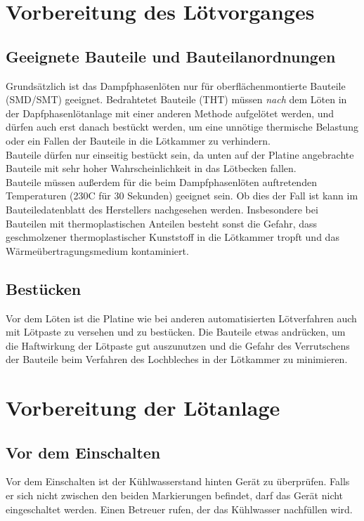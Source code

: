 \documentclass{\basedir/fablab-document}
\begin{document}
	\section{Vorbereitung des Lötvorganges}
	\subsection{Geeignete Bauteile und Bauteilanordnungen}
	
	Grundsätzlich ist das Dampfphasenlöten nur für oberflächenmontierte Bauteile (SMD/SMT) geeignet. Bedrahtetet Bauteile (THT) müssen \textit{nach} dem Löten in der Dapfphasenlötanlage mit einer anderen Methode aufgelötet werden, und dürfen auch erst danach bestückt werden, um eine unnötige thermische Belastung oder ein Fallen der Bauteile in die Lötkammer zu verhindern.\\

Bauteile dürfen nur einseitig bestückt sein, da unten auf der Platine angebrachte Bauteile mit sehr hoher Wahrscheinlichkeit in das Lötbecken fallen. \\

Bauteile müssen außerdem für die beim Dampfphasenlöten auftretenden Temperaturen (230C für 30 Sekunden) geeignet sein. Ob dies der Fall ist kann im Bauteiledatenblatt des Herstellers nachgesehen werden. Insbesondere bei Bauteilen mit thermoplastischen Anteilen besteht sonst die Gefahr, dass geschmolzener thermoplastischer Kunststoff in die Lötkammer tropft und das Wärmeübertragungsmedium kontaminiert.

\subsection{Bestücken}

Vor dem Löten ist die Platine wie bei anderen automatisierten Lötverfahren auch mit Lötpaste zu versehen und zu bestücken. Die Bauteile etwas andrücken, um die Haftwirkung der Lötpaste gut auszunutzen und die Gefahr des Verrutschens der Bauteile beim Verfahren des Lochbleches in der Lötkammer zu minimieren.

\section{Vorbereitung der Lötanlage}
\subsection{Vor dem Einschalten}

Vor dem Einschalten ist der Kühlwasserstand hinten Gerät zu überprüfen. Falls er sich nicht zwischen den beiden Markierungen befindet, darf das Gerät nicht eingeschaltet werden. Einen Betreuer rufen, der das Kühlwasser nachfüllen wird.
\end{document}
